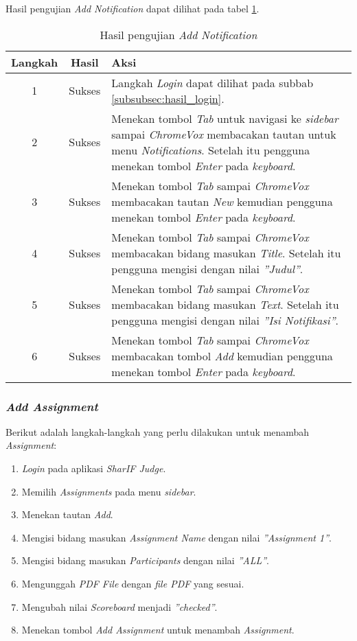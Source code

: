 Hasil pengujian \textit{Add Notification} dapat dilihat pada tabel \ref{tab:hasil_add_notification}.

\begin{table}[H]
	\centering
	\caption{Hasil pengujian \textit{Add Notification}}
	\label{tab:hasil_add_notification}
	\begin{tabular}{|c|c|p{12cm}|}
		\toprule
		Langkah & Hasil & Aksi\\
		\midrule
		1 & Sukses & Langkah \textit{Login} dapat dilihat pada subbab \ref{subsubsec:hasil_login}.\\
		2 & Sukses & Menekan tombol \textit{Tab} untuk navigasi ke \textit{sidebar} sampai \textit{ChromeVox} membacakan tautan untuk menu \textit{Notifications}. Setelah itu pengguna menekan tombol \textit{Enter} pada \textit{keyboard}.\\
		3 & Sukses & Menekan tombol \textit{Tab} sampai \textit{ChromeVox} membacakan tautan \textit{New} kemudian pengguna menekan tombol \textit{Enter} pada \textit{keyboard}.\\
		4 & Sukses & Menekan tombol \textit{Tab} sampai \textit{ChromeVox} membacakan bidang masukan \textit{Title}. Setelah itu pengguna mengisi dengan nilai \textit{''Judul''}.\\
		5 & Sukses & Menekan tombol \textit{Tab} sampai \textit{ChromeVox} membacakan bidang masukan \textit{Text}. Setelah itu pengguna mengisi dengan nilai \textit{''Isi Notifikasi''}.\\
		6 & Sukses & Menekan tombol \textit{Tab} sampai \textit{ChromeVox} membacakan tombol \textit{Add} kemudian pengguna menekan tombol \textit{Enter} pada \textit{keyboard}.\\
		\bottomrule
	\end{tabular}
\end{table}

\subsubsection{\textit{Add Assignment}}
\label{subsubsec:skenario_add_assignment}
Berikut adalah langkah-langkah yang perlu dilakukan untuk menambah \textit{Assignment}:

\begin{enumerate}
	\item \textit{Login} pada aplikasi \textit{SharIF Judge}.
	\item Memilih \textit{Assignments} pada menu \textit{sidebar}.
	\item Menekan tautan \textit{Add}.
	\item Mengisi bidang masukan \textit{Assignment Name} dengan nilai \textit{''Assignment 1''}.
	\item Mengisi bidang masukan \textit{Participants} dengan nilai \textit{''ALL''}.
	\item Mengunggah \textit{PDF File} dengan \textit{file PDF} yang sesuai.
	\item Mengubah nilai \textit{Scoreboard} menjadi \textit{''checked''}.
	\item Menekan tombol \textit{Add Assignment} untuk menambah \textit{Assignment}.
\end{enumerate}

